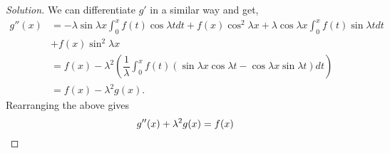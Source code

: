 \documentclass[12pt]{article}
\theoremstyle{definition}
\newenvironment{soln}{\begin{proof}[Solution]}{\end{proof}}
\begin{document}
\begin{itemize}
\begin{soln}
		We can differentiate $g'$ in a similar way and get,
		\begin{align*}
			g''(x) &= -\lambda\sin\lambda x\int_{0}^{x} f(t)\cos \lambda t dt + f(x)\cos^2\lambda x + \lambda \cos \lambda x \int_{0}^{x} f(t)\sin \lambda t dt \\
			& + f(x)\sin^2 \lambda x\\
			&= f(x) - \lambda^2\left(\dfrac{1}{\lambda}\int_{0}^{x} f(t) \left(\sin \lambda x\cos \lambda t - \cos \lambda x \sin \lambda t\right) dt\right)\\
			&= f(x) - \lambda^2g(x).
		\end{align*}
		Rearranging the above gives
		\begin{equation*} 
			g''(x) + \lambda^2g(x) = f(x) \qedhere
		\end{equation*}
	\end{soln}
\end{itemize}
%
%
%
\end{document}
